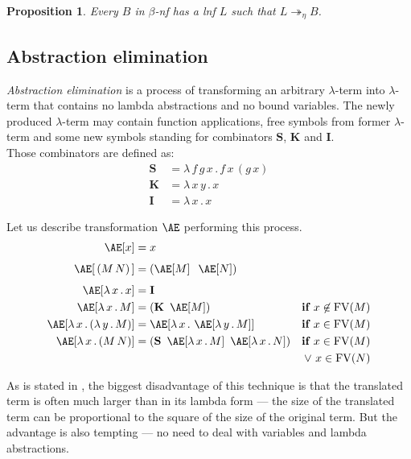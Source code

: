 \documentclass{sig-alternate}
\newtheorem{proposition}{Proposition}
\newcommand{\Lets}{Let us\xspace}
\newcommand{\lterm}{$\lambda$-term\xspace}
\newcommand{\lamb}[2]{( \lambda \, #1 \, . \, #2 )}
\newcommand{\lam}[2]{\lambda \, #1 \, . \, #2}
\newcommand{\FV}{\mathop{\mathrm{FV}}}
\newcommand{\Scomb }{\mathbf{S}}
\newcommand{\Kcomb }{\mathbf{K}}
\newcommand{\Icomb }{\mathbf{I}}
\newcommand{\bnf}{$\beta$-\textit{nf}\xspace}
\newcommand{\lnf}{\textit{lnf}\xspace}
\newcommand{\Ae}{\mathop{\mathrm{\AE}}}
\begin{document}
\begin{proposition}
Every $B$ in \bnf has a \lnf 
$L$ such that $L \twoheadrightarrow_{\eta} B$.
\end{proposition}

\subsection{Abstraction elimination}

\textit{Abstraction elimination} is a process of transforming 
an arbitrary \lterm into \lterm that contains no lambda abstractions
and no bound variables.
The newly produced \lterm may contain function applications, 
free symbols from former \lterm and some new symbols standing for 
combinators $\Scomb$, $\Kcomb$ and $\Icomb$. \\

Those combinators are defined as:
\begin{align*}
\Scomb &= \lam{f\,g\,x}{f\,x\,(g\,x)} \\
\Kcomb &= \lam{x\,y}{x} \\
\Icomb &= \lam{x}{x} 
\end{align*}


\Lets describe transformation $\Ae$ performing this 
process.
\begin{align*}
\Ae[x]           &= x &\\[0.4em]
\Ae[\,(M\,N)\,]  &= (\Ae[M]\;\;\Ae[N]) &\\[0.4em]
\Ae[\lam{x}{x}]  &= \Icomb &\\
\Ae[\lam{x}{M}]  &= (\Kcomb~\Ae[M]) &\textbf{if } x \not\in \FV(M)\\
\Ae[\lam{x}{\lamb{y}{M}}] &= \Ae[\lam{x}{\Ae[\lam{y}{M}]}]  
&\textbf{if } x \in \FV(M)\\
\Ae[\lam{x}{(M\,N)}] &= (\Scomb~\Ae[\lam{x}{M}]~\Ae[\lam{x}{N}])  
&\textbf{if } x \in \FV(M)\\
&&\vee~ x \in \FV(N)\\
\end{align*}

As is stated in \cite{jones87},
the biggest disadvantage of this technique is that the translated
term is often much larger than in its lambda form --- the size of
the translated term can be proportional to the square of the size 
of the original term. But the advantage is also tempting --- no need to deal with variables and lambda abstractions.
\end{document}
